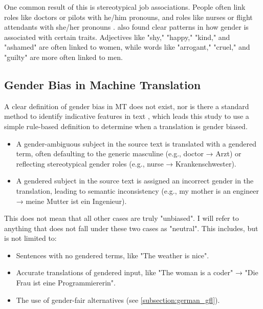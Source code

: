        One common result of this is stereotypical job associations. People often link roles like doctors or pilots with he/him pronouns, and roles like nurses or flight attendants with she/her pronouns \parencite{shresthaExploringGenderBiases2022}. \textcite{pratesAssessingGenderBias2019} also found clear patterns in how gender is associated with certain traits. Adjectives like "shy," "happy," "kind," and "ashamed" are often linked to women, while words like "arrogant," "cruel," and "guilty" are more often linked to men. 

  
 \subsection{Gender Bias in Machine Translation} \label{subsection:definition_gb}
    A clear definition of gender bias in MT does not exist, nor is there a standard method to identify indicative features in text \parencite{barclayInvestigatingMarkersDrivers2024a}, which leads this study to use a simple rule-based definition to determine when a translation is gender biased.

        \begin{itemize}
        \item A gender-ambiguous subject in the source text is translated with a gendered term, often defaulting to the generic masculine (e.g., doctor → Arzt) or reflecting stereotypical gender roles (e.g., nurse → Krankenschwester).
        \item A gendered subject in the source text is assigned an incorrect gender in the translation, leading to semantic inconsistency (e.g., my mother is an engineer → meine Mutter ist ein Ingenieur).
        \end{itemize}

    This does not mean that all other cases are truly "unbiased". I will refer to anything that does not fall under these two cases as "neutral". This includes, but is not limited to:

        \begin{itemize}
        \item Sentences with no gendered terms, like "The weather is nice".
        \item Accurate translations of gendered input, like "The woman is a coder" → "Die Frau ist eine Programmiererin".
        \item The use of gender-fair alternatives (see \autoref{subsection:german_gfl}).
        \end{itemize}


